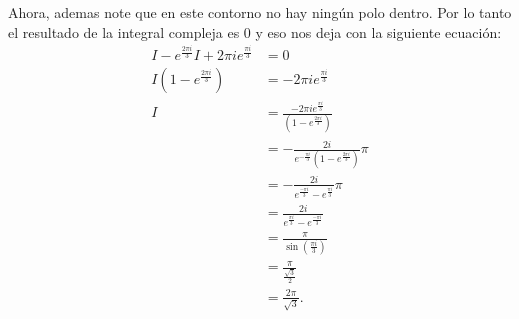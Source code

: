 \documentclass{report}
\begin{document}
Ahora, ademas note que en este contorno no hay ningún polo dentro. Por lo tanto el resultado de la integral compleja es 0 y eso nos deja con la siguiente ecuación:
\begin{align*}
  I - e^{\frac{2\pi i}{3}}I + 2\pi ie^{\frac{\pi i}{3}} &= 0\\
  I \left( 1 - e^{\frac{2\pi i}{3}} \right) &= - 2\pi i e^{\frac{\pi i}{3}}\\
  I &= \frac{- 2\pi i e^{\frac{\pi i}{3}}}{\left( 1 - e^{\frac{2\pi i}{3}} \right)} \\
  &= -\frac{2i}{e^{-\frac{\pi i}{3}} \left( 1 - e^{\frac{2\pi i}{3}} \right) }\pi \\
  &= -\frac{2i}{e^{\frac{-\pi i}{3}} - e^{\frac{\pi i}{3}}}\pi \\
  &= \frac{2i}{e^{\frac{\pi i}{3}} - e^{\frac{-\pi i}{3}}} \\
  &= \frac{\pi}{\sin\left( \frac{\pi i}{3} \right) } \\
  &= \frac{\pi}{\frac{\sqrt{3} }{2}} \\
  &= \frac{2\pi}{\sqrt{3} }
.\end{align*}
\end{document}
